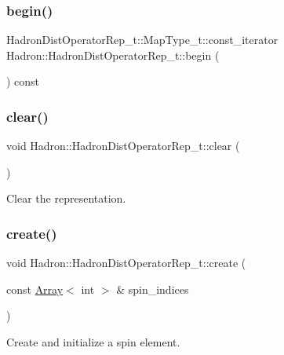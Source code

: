 \subsubsection{\texorpdfstring{begin()}{begin()}}
{\footnotesize\ttfamily Hadron\+Dist\+Operator\+Rep\+\_\+t\+::\+Map\+Type\+\_\+t\+::const\+\_\+iterator Hadron\+::\+Hadron\+Dist\+Operator\+Rep\+\_\+t\+::begin (\begin{DoxyParamCaption}{ }\end{DoxyParamCaption}) const}

\mbox{\label{classHadron_1_1HadronDistOperatorRep__t_a8d4c5288c2e0dd19b4af4127eb26a9cd}} 
\subsubsection{\texorpdfstring{clear()}{clear()}}
{\footnotesize\ttfamily void Hadron\+::\+Hadron\+Dist\+Operator\+Rep\+\_\+t\+::clear (\begin{DoxyParamCaption}{ }\end{DoxyParamCaption})}



Clear the representation. 

\mbox{\label{classHadron_1_1HadronDistOperatorRep__t_a5d71057f500ecb252c0d204434d45ccd}} 
\subsubsection{\texorpdfstring{create()}{create()}}
{\footnotesize\ttfamily void Hadron\+::\+Hadron\+Dist\+Operator\+Rep\+\_\+t\+::create (\begin{DoxyParamCaption}\item[{const \mbox{\hyperlink{classXMLArray_1_1Array}{Array}}$<$ int $>$ \&}]{spin\+\_\+indices }\end{DoxyParamCaption})\hspace{0.3cm}{\ttfamily [protected]}}



Create and initialize a spin element. 

